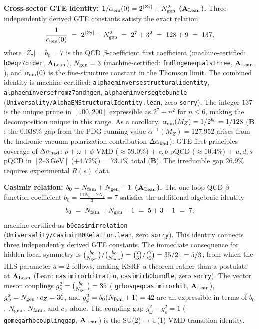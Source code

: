 \documentclass[11pt]{article}
\theoremstyle{remark}
\newcommand{\Ngen}{N_{\rm gen}}
\newcommand{\Nfam}{N_{\rm fam}}
\newcommand{\lean}[1]{%
  \penalty-100
  \begingroup\def\_{\textunderscore\allowbreak}\texttt{#1}\endgroup}
\newcommand{\CatAL}{\ensuremath{\textbf{A}_{\rm Lean}}}
\newcommand{\CatB}{\textbf{B}}
\begin{document}
\medskip

\textbf{Cross-sector GTE identity: $1/\alpha_{\rm em}(0) = 2^{|Z_7|} + \Ngen^2$ ($\CatAL$).}
Three independently derived GTE constants satisfy the exact relation
\begin{equation}
  \frac{1}{\alpha_{\rm em}(0)}
  \;=\; 2^{|Z_7|} + \Ngen^2
  \;=\; 2^7 + 3^2
  \;=\; 128 + 9
  \;=\; 137,
  \label{eq:alpha_em_identity}
\end{equation}
where $|Z_7| = b_0 = 7$ is the QCD $\beta$-coefficient first coefficient
(machine-certified: \lean{b0\_eq\_z7\_order}, $\CatAL$), $\Ngen = 3$ (machine-certified:
\lean{fmdl\_ngen\_equals\_three}, $\CatAL$), and $\alpha_{\rm em}(0)$ is the
fine-structure constant in the Thomson limit.
The combined identity is machine-certified: \lean{alpha\_em\_inverse\_structural\_identity},
\lean{alpha\_em\_inverse\_from\_z7\_and\_ngen}, \lean{alpha\_em\_inverse\_gte\_bundle}
(\texttt{Universality/AlphaEMStructuralIdentity.lean}, zero \texttt{sorry}).
The integer $137$ is the unique prime in $[100, 200]$ expressible as
$2^7 + n^2$ for $n \leq 6$, making the decomposition unique in this range.
As a corollary, $\alpha_{\rm em}(M_Z) = 1/2^{b_0} = 1/128$ ($\CatB$;
the $0.038\%$ gap from the PDG running value $\alpha^{-1}(M_Z) = 127.952$
arises from the hadronic vacuum polarization contribution $\Delta\alpha_{\rm had}$).
GTE first-principles coverage of $\Delta\alpha_{\rm had}$: $\rho{+}\omega{+}\phi$ VMD
(${\approx}59.0\%$) + $c,b$ pQCD (${\approx}10.4\%$) + $u,d,s$ pQCD in
$[2\text{--}3\,\mathrm{GeV}]$ ($+4.72\%$) = $73.1\%$ total ($\CatB$).
The irreducible gap $26.9\%$ requires experimental $R(s)$ data.

\medskip

\textbf{Casimir relation: $b_0 = \Nfam + \Ngen - 1$ ($\CatAL$).}
The one-loop QCD $\beta$-function coefficient
$b_0 = \frac{11N_c - 2N_f}{3} = 7$ satisfies the additional algebraic identity
\begin{equation}
  b_0 \;=\; \Nfam + \Ngen - 1 \;=\; 5 + 3 - 1 \;=\; 7,
  \label{eq:casimir_relation}
\end{equation}
machine-certified as \lean{b0\_casimir\_relation}
(\texttt{Universality/CasimirB0Relation.lean}, zero \texttt{sorry}).
This identity connects three independently derived GTE constants.
The immediate consequence for hidden local symmetry is
$\binom{b_0}{\Ngen} / \binom{b_0}{\Nfam} = \binom{7}{3}/\binom{7}{2} = 35/21 = 5/3$,
from which the HLS parameter $a = 2$ follows, making KSRF a theorem
rather than a postulate at \CatAL{} (Lean: \lean{casimir\_orbit\_ratio},
\lean{casimir\_b0\_bundle}, zero \texttt{sorry}).
The vector meson couplings $g_\rho^2 = \binom{b_0}{\Ngen} = 35$
(\lean{g\_rho\_sq\_eq\_casimir\_orbit}, $\CatAL$),
$g_\omega^2 = \Ngen \cdot c_Z = 36$, and $g_\phi^2 = b_0(\Nfam+1) = 42$
are all expressible in terms of $b_0$, $\Ngen$, $\Nfam$, and $c_Z$ alone.
The coupling gap $g_\omega^2 - g_\rho^2 = 1$
(\lean{g\_omega\_rho\_coupling\_gap}, $\CatAL$) is the SU(2)$\to$U(1) VMD
transition identity.
\end{document}
